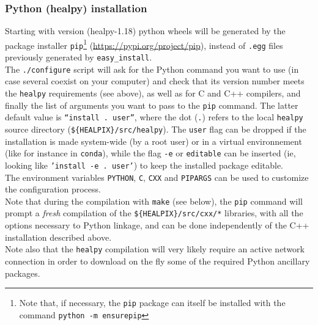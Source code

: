 \documentclass[12pt,twoside]{article}
\newcommand{\doubledash}{\latexhtml{-{}-}{-{}--}}
\begin{document}
\subsubsection{Python (healpy) installation}%
\label{install:healpy:config}%
%
Starting with version  (healpy-1.18) python wheels
will be generated by the package installer \texttt{pip}\footnote{Note that, if necessary, the \texttt{pip} package can itself be
installed with the command
\texttt{python -m ensurepip}}
 (\url{https://pypi.org/project/pip}), instead of \texttt{.egg} files previously generated by
\texttt{easy\_install}.\\
The \texttt{./configure} script will ask for the Python command you want to use 
(in case several coexist on your computer) and check that its version number
meets the \texttt{healpy} requirements (see above), as well as for C and C++
compilers,
and finally the list of arguments you want to pass to the \texttt{pip} command. The latter default value is
\texttt{``install . \doubledash user''},  where the dot (\texttt{.}) refers to
the local \texttt{healpy} source directory (\texttt{\$\{HEALPIX\}/src/healpy}). The \texttt{\doubledash user} flag can be dropped if
the installation is made system-wide (by a root user) or in a virtual
environnement (like for instance in \texttt{conda}),
while the flag \texttt{-e} or  \texttt{\doubledash editable} can be inserted (ie, looking
like \texttt{'install -e . \doubledash user'}) to keep the installed package editable.\\
The environment variables \texttt{PYTHON}, \texttt{C}, \texttt{CXX} and
\texttt{PIPARGS} can be used to customize the configuration process.\\
Note that during the compilation with \texttt{make} (see below), the
\texttt{pip} command will prompt a {\em fresh} compilation of the
 \texttt{\$\{HEALPIX\}/src/cxx/*} libraries, with all the options necessary to Python linkage, and
 can be done independently of the C++ installation described above.\\
Note also that the \texttt{healpy} compilation will very likely 
require an active network connection in order
to download on the fly some of the required Python ancillary packages.
\end{document}
